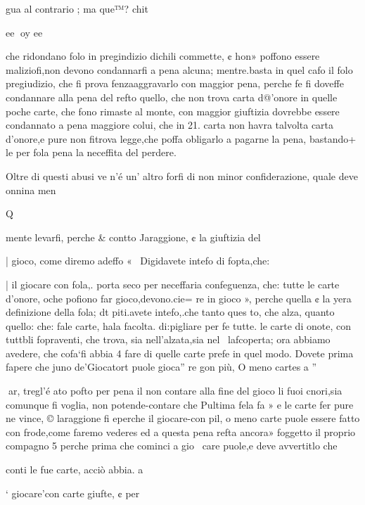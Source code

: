 \documentclass[11pt,a6paper]{article}
\begin{document}
gua al contrario ; ma que™?
chit

 

 

 

 

ee
oy ee

che ridondano folo in pregindizio dichili commette, ¢ hon»
poffono essere maliziofi,non devono condannarfi a pena alcuna; mentre.basta in quel cafo il
folo pregiudizio, che fi prova
fenzaaggravarlo con maggior
pena, perche fe fi doveffe condannare alla pena del refto quello, che non trova carta d@’onore
in quelle poche carte, che fono
rimaste al monte, con maggior
giuftizia dovrebbe essere condannato a pena maggiore colui,
che in 21. carta non havra talvolta carta d’onore,e pure non
fitrova legge,che poffa obligarlo a pagarne la pena, bastando+
le per fola pena la neceffita del
perdere.

Oltre di questi abusi ve n’é un’
altro forfi di non minor confiderazione, quale deve onnina
men
 

 

 
 

Q

mente levarfi, perche & contto
Jaraggione, ¢ la giuftizia del

| gioco, come diremo adeffo «
  ~Digidavete intefo di fopta,che:

| il giocare con fola,. porta seco
per neceffaria confeguenza, che:
tutte le carte d’onore, oche
pofiono far gioco,devono.cie=
re in gioco », perche quella ¢ la
yera definizione della fola; dt
piti.avete intefo,.che tanto ques
to, che alza, quanto quello: che:
fale carte, hala facolta. di:pigliare per fe tutte. le carte di
onote, con tuttbli fopraventi,
che trova, sia nell’alzata,sia nel~
lafcoperta; ora abbiamo avedere, che cofa‘fi abbia 4 fare di
quelle carte prefe in quel modo.
Dovete prima fapere che
juno de’Giocatort puole gioca”
re gon più, O meno cartes a ”

 
ar,
tregl’é ato pofto per pena il
non contare alla fine del gioco
li fuoi cnori,sia comunque fi voglia, non potende-contare che
Pultima fela fa » e le carte fer
pure ne vince, © laraggione fi
eperche il giocare-con pil, o
meno carte puole essere fatto
con frode,come faremo vederes
ed a questa pena refta ancora»
foggetto il proprio compagno 5
perche prima che cominci a gio~
care puole,e deve avvertitlo che

conti le fue carte, acciò abbia. a

‘ giocare'con carte giufte, ¢ per
\end{document}
